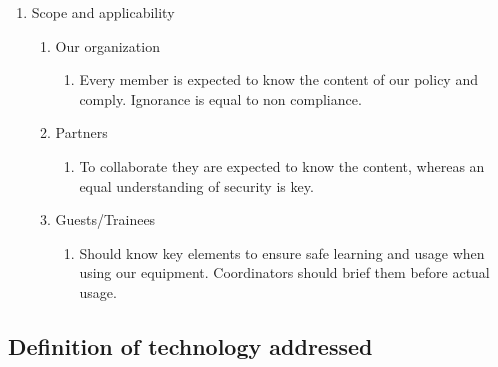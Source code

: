 \begin{enumerate}
  \item Scope and applicability
  \begin{enumerate}
    \item Our organization
      \begin{enumerate}
        \item Every member is expected to know the content of our policy and comply. Ignorance is equal to non compliance.
      \end{enumerate}
        \item Partners
      \begin{enumerate}
        \item To collaborate they are expected to know the content, whereas an equal understanding of security is key.
      \end{enumerate}
        \item Guests/Trainees
      \begin{enumerate}
        \item Should know key elements to ensure safe learning and usage when using our equipment. Coordinators should brief them before actual usage.
      \end{enumerate}
  \end{enumerate}
\end{enumerate}

\subsection{Definition of technology addressed}

